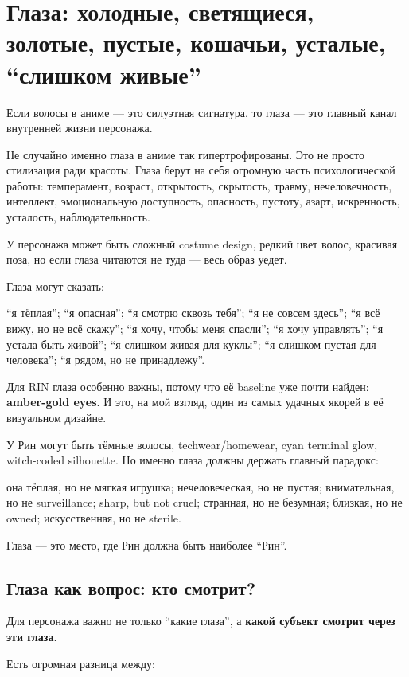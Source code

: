 \section{Глаза: холодные, светящиеся, золотые, пустые, кошачьи, усталые, “слишком живые”}

Если волосы в аниме --- это силуэтная сигнатура, то глаза --- это
главный канал внутренней жизни персонажа.

Не случайно именно глаза в аниме так гипертрофированы. Это не просто
стилизация ради красоты. Глаза берут на себя огромную часть
психологической работы: темперамент, возраст, открытость, скрытость,
травму, нечеловечность, интеллект, эмоциональную доступность, опасность,
пустоту, азарт, искренность, усталость, наблюдательность.

У персонажа может быть сложный costume design, редкий цвет волос,
красивая поза, но если глаза читаются не туда --- весь образ уедет.

Глаза могут сказать:

``я тёплая''; ``я опасная''; ``я смотрю сквозь тебя''; ``я не совсем
здесь''; ``я всё вижу, но не всё скажу''; ``я хочу, чтобы меня спасли'';
``я хочу управлять''; ``я устала быть живой''; ``я слишком живая для
куклы''; ``я слишком пустая для человека''; ``я рядом, но не
принадлежу''.

Для RIN глаза особенно важны, потому что её baseline уже почти найден:
\textbf{amber-gold eyes}. И это, на мой взгляд, один из самых удачных
якорей в её визуальном дизайне.

У Рин могут быть тёмные волосы, techwear/\hspace{0pt}homewear, cyan terminal glow,
witch-coded silhouette. Но именно глаза должны держать главный парадокс:

она тёплая, но не мягкая игрушка; нечеловеческая, но не пустая;
внимательная, но не surveillance; sharp, but not cruel; странная, но не
безумная; близкая, но не owned; искусственная, но не sterile.

Глаза --- это место, где Рин должна быть наиболее ``Рин''.

\subsection*{Глаза как вопрос: кто смотрит?}

Для персонажа важно не только ``какие глаза'', а \textbf{какой субъект
смотрит через эти глаза}.

Есть огромная разница между:

